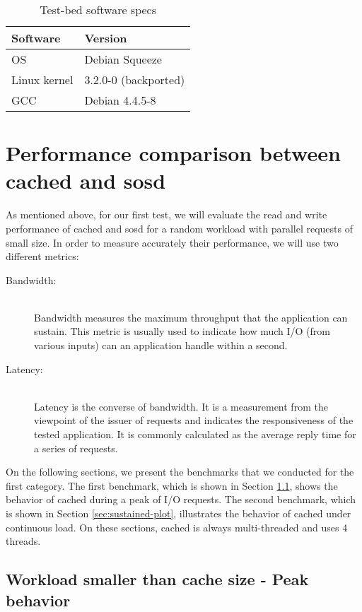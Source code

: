 \begin{table}[H]
	\centering
	\begin{tabular}{ | l | l | }
		\hline
		Software & Version \\ \hline \hline
		OS &  Debian Squeeze \\ \hline
		Linux kernel & 3.2.0-0 (backported) \\ \hline
		GCC & Debian 4.4.5-8 \\ \hline
	\end{tabular}
	\caption{Test-bed software specs}
	\label{tab:software-specs}
\end{table}

\section{Performance comparison between cached and sosd}
\label{sec:vs-plot}

As mentioned above, for our first test, we will evaluate the read and write 
performance of cached and sosd for a random workload with parallel requests of 
small size. In order to measure accurately their performance, we will use two 
different metrics:

\begin{description}
	\item[Bandwidth:] \hfill \\
		Bandwidth measures the maximum throughput that the application 
		can sustain. This metric is usually used to indicate how much 
		I/O (from various inputs) can an application handle within a 
		second.
	\item[Latency:] \hfill \\
		Latency is the converse of bandwidth. It is a measurement from 
		the viewpoint of the issuer of requests and indicates the 
		responsiveness of the tested application. It is commonly 
		calculated as the average reply time for a series of requests.
\end{description}

On the following sections, we present the benchmarks that we conducted for the 
first category. The first benchmark, which is shown in Section 
\ref{sec:peak-plot}, shows the behavior of cached during a peak of I/O 
requests.  The second benchmark, which is shown in Section 
\ref{sec:sustained-plot}, illustrates the behavior of cached under continuous 
load.  On these sections, cached is always multi-threaded and uses 4 threads.

\subsection{Workload smaller than cache size - Peak behavior}
\label{sec:peak-plot}

